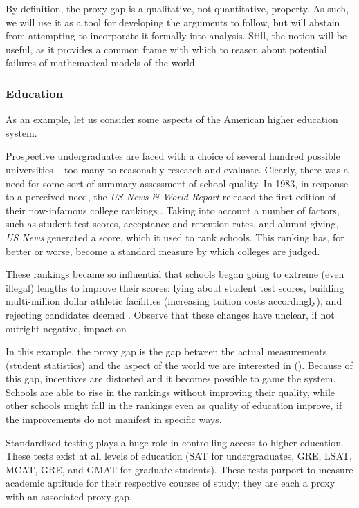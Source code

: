 By definition, the proxy gap is a qualitative, not quantitative, property.
As such, we will use it as a tool for developing the arguments to follow, but will abstain from attempting to incorporate it formally into analysis.
Still, the notion will be useful, as it provides a common frame with which to reason about potential failures of mathematical models of the world.

\subsubsection{Education}

As an example, let us consider some aspects of the American higher education system.

Prospective undergraduates are faced with a choice of several hundred possible universities -- too many to reasonably research and evaluate.
Clearly, there was a need for some sort of summary assessment of school quality. In 1983, in response to a perceived need, the \textit{US News \& World Report} released the first edition of their now-infamous college rankings \citep{oneil}.
Taking into account a number of factors, such as student test scores, acceptance and retention rates, and alumni giving, \textit{US News} generated a score, which it used to rank schools.
This ranking has, for better or worse, become a standard measure by which colleges are judged.

These rankings became so influential that schools began going to extreme (even illegal) lengths to improve their scores: lying about student test scores, building multi-million dollar athletic facilities (increasing tuition costs accordingly), and rejecting candidates deemed  \citep{oneil}.
Observe that these changes have unclear, if not outright negative, impact on .

 In this example, the proxy gap is the gap between the actual measurements (student statistics) and the aspect of the world we are interested in ().
 Because of this gap, incentives are distorted and it becomes possible to game the system.
 Schools are able to rise in the rankings without improving their quality, while other schools might fall in the rankings even as quality of education improve, if the improvements do not manifest in specific ways.

\bigskip

Standardized testing plays a huge role in controlling access to higher education.
These tests exist at all levels of education (SAT for undergraduates, GRE, LSAT, MCAT, GRE, and GMAT for graduate students).
These tests purport to measure academic aptitude for their respective courses of study; they are each a proxy with an associated proxy gap.

